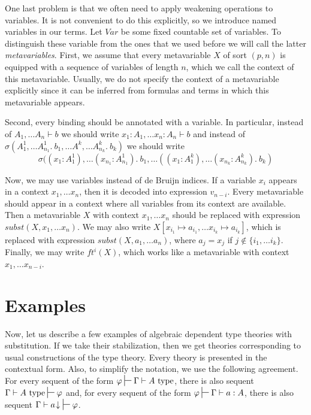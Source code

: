 \documentclass[reqno]{amsart}
\theoremstyle{definition}
\theoremstyle{remark}
\newcommand{\type}{\mathrm{type}}
\numberwithin{figure}{section}
\begin{document}
One last problem is that we often need to apply weakening operations to variables.
It is not convenient to do this explicitly, so we introduce named variables in our terms.
Let $Var$ be some fixed countable set of variables.
To distinguish these variable from the ones that we used before we will call the latter \emph{metavariables}.
First, we assume that every metavariable $X$ of sort $(p,n)$ is equipped with a sequence of variables of length $n$, which we call the context of this metavariable.
Usually, we do not specify the context of a metavariable explicitly since it can be inferred from formulas and terms in which this metavariable appears.

Second, every binding should be annotated with a variable.
In particular, instead of $A_1, \ldots A_n \vdash b$ we should write $x_1 : A_1, \ldots x_n : A_n \vdash b$
and instead of $\sigma(A^1_1, \ldots A^1_{n_1}.\ b_1, \ldots A^k, \ldots A^k_{n_k}.\ b_k)$ we should write
\[ \sigma((x_1 : A^1_1), \ldots (x_{n_1} : A^1_{n_1}).\ b_1, \ldots ((x_1 : A^k_1), \ldots (x_{n_k} : A^k_{n_k}).\ b_k) \]

Now, we may use variables instead of de Bruijn indices.
If a variable $x_i$ appears in a context $x_1, \ldots x_n$, then it is decoded into expression $v_{n-i}$.
Every metavariable should appear in a context where all variables from its context are available.
Then a metavariable $X$ with context $x_1, \ldots x_n$ should be replaced with expression $subst(X, x_1, \ldots x_n)$.
We may also write $X[x_{i_1} \mapsto a_{i_1}, \ldots x_{i_k} \mapsto a_{i_k}]$,
which is replaced with expression $subst(X, a_1, \ldots a_n)$, where $a_j = x_j$ if $j \notin \{ i_1, \ldots i_k \}$.
Finally, we may write $ft^i(X)$, which works like a metavariable with context $x_1, \ldots x_{n-i}$.

\section{Examples}

Now, let us describe a few examples of algebraic dependent type theories with substitution.
If we take their stabilization, then we get theories corresponding to usual constructions of the type theory.
Every theory is presented in the contextual form.
Also, to simplify the notation, we use the following agreement.
For every sequent of the form $\varphi \sststile{}{} \Gamma \vdash A\ \type$, there is also sequent $\Gamma \vdash A\ \type \sststile{}{} \varphi$
and, for every sequent of the form $\varphi \sststile{}{} \Gamma \vdash a : A$, there is also sequent $\Gamma \vdash a\!\downarrow\ \sststile{}{} \varphi$.
\end{document}
